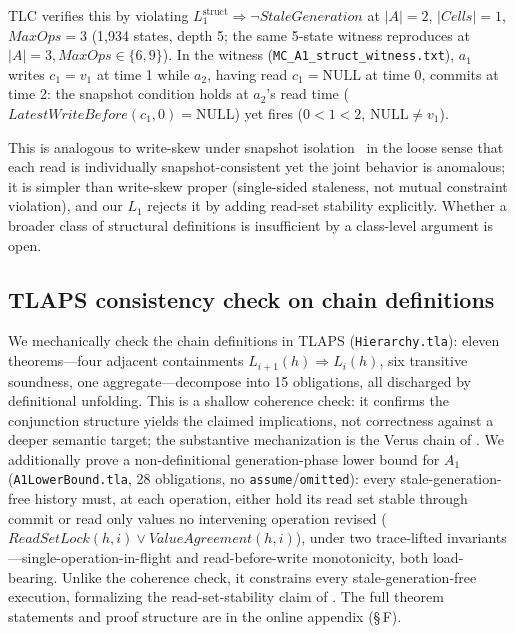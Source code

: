 \documentclass[journal,compsoc,10pt]{IEEEtran}
\providecommand{\citep}{\cite}
\theoremstyle{definition}
\theoremstyle{remark}
\newcommand{\fld}[1]{\mathit{#1}}
\begin{document}
\noindent
TLC verifies this by violating $L_1^{\text{struct}} \Rightarrow \neg
\fld{StaleGeneration}$ at $|A|=2$, $|\fld{Cells}|=1$, $\fld{MaxOps}=3$
(1{,}934 states, depth 5; the same 5-state witness reproduces at
$|A|=3,\fld{MaxOps}\in\{6,9\}$). In the witness
(\texttt{MC\_A1\_struct\_witness.txt}), $a_1$ writes $c_1=v_1$ at time 1
while $a_2$, having read $c_1=\mathrm{NULL}$ at time 0, commits at time 2:
the snapshot condition holds at $a_2$'s read time
($\fld{LatestWriteBefore}(c_1,0)=\mathrm{NULL}$) yet  fires
($0<1<2$, $\mathrm{NULL}\neq v_1$).

This is analogous to write-skew under snapshot
isolation~\citep{BerensonEtAl1995,FeketeEtAl2005MakingSI,CahillRohmFekete2008SSI}
in the loose sense that each read is individually snapshot-consistent yet
the joint behavior is anomalous; it is simpler than write-skew proper
(single-sided staleness, not mutual constraint violation), and our $L_1$
rejects it by adding read-set stability explicitly. Whether a broader
class of structural definitions is insufficient by a class-level argument
is open.

\subsection{TLAPS consistency check on chain definitions}
\label{sec:mech-check}
We mechanically check the chain definitions in TLAPS
(\texttt{Hierarchy.tla}): eleven theorems---four adjacent containments
$L_{i+1}(h)\Rightarrow L_i(h)$, six transitive soundness, one
aggregate---decompose into 15 obligations, all discharged by definitional
unfolding. This is a shallow coherence check: it confirms the conjunction
structure yields the claimed implications, not correctness against a deeper
semantic target; the substantive mechanization is the Verus chain of
. We additionally prove a non-definitional
generation-phase lower bound for $A_1$ (\texttt{A1LowerBound.tla}, 28
obligations, no \texttt{assume}/\texttt{omitted}): every
stale-generation-free history must, at each operation, either hold its read
set stable through commit or read only values no intervening operation
revised ($\fld{ReadSetLock}(h,i)\vee\fld{ValueAgreement}(h,i)$), under two
trace-lifted invariants---single-operation-in-flight and read-before-write
monotonicity, both load-bearing. Unlike the coherence check, it constrains
every stale-generation-free execution, formalizing the read-set-stability
claim of . The full theorem statements and
proof structure are in the online appendix (\S\,F).
\end{document}
